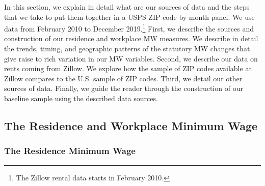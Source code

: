 
In this section, we explain in detail what are our sources of data and the steps that 
we take to put them together in a USPS ZIP code by month panel. We use data from February 
2010 to December 2019.\footnote{The Zillow rental data starts in February 2010.} 
First, we describe the sources and construction of our residence and workplace MW measures. 
We describe in detail the trends, timing, and geographic patterns of the statutory MW changes 
that give raise to rich variation in our MW variables. Second, we describe our data on rents 
coming from Zillow. We explore how the sample of ZIP codes available at Zillow compares to the 
U.S. sample of ZIP codes. Third, we detail our other sources of data. Finally, we guide 
the reader through the construction of our baseline sample using the described data sources.

\subsection{The Residence and Workplace Minimum Wage}\label{sec:mw_construction}


\subsubsection{The Residence Minimum Wage}\label{data_res_mw}

